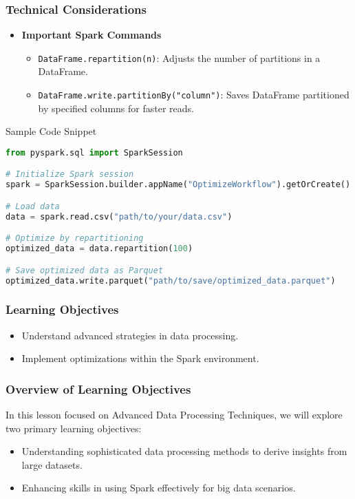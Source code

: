 \documentclass[aspectratio=169]{beamer}
\begin{document}
\begin{frame}[fragile]
    \frametitle{Technical Considerations}
    
    \begin{itemize}
        \item \textbf{Important Spark Commands}
            \begin{itemize}
                \item \texttt{DataFrame.repartition(n)}: Adjusts the number of partitions in a DataFrame.
                \item \texttt{DataFrame.write.partitionBy("column")}: Saves DataFrame partitioned by specified columns for faster reads.
            \end{itemize}
    \end{itemize}
    
    \begin{block}{Sample Code Snippet}
    \begin{lstlisting}[language=Python]
from pyspark.sql import SparkSession

# Initialize Spark session
spark = SparkSession.builder.appName("OptimizeWorkflow").getOrCreate()

# Load data
data = spark.read.csv("path/to/your/data.csv")

# Optimize by repartitioning
optimized_data = data.repartition(100)

# Save optimized data as Parquet
optimized_data.write.parquet("path/to/save/optimized_data.parquet")
    \end{lstlisting}
    \end{block}
\end{frame}

\begin{frame}[fragile]
    \frametitle{Learning Objectives}
    \begin{itemize}
        \item Understand advanced strategies in data processing.
        \item Implement optimizations within the Spark environment.
    \end{itemize}
\end{frame}

\begin{frame}[fragile]
    \frametitle{Overview of Learning Objectives}
    In this lesson focused on Advanced Data Processing Techniques, we will explore two primary learning objectives:
    \begin{itemize}
        \item Understanding sophisticated data processing methods to derive insights from large datasets.
        \item Enhancing skills in using Spark effectively for big data scenarios.
    \end{itemize}
\end{frame}
\end{document}
